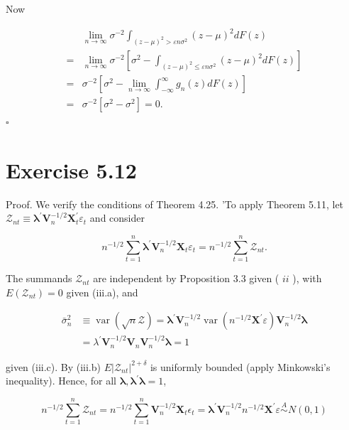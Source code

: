 \documentclass[10pt]{article}
\begin{document}
Now

$$
\begin{aligned}
& \lim _{n \rightarrow \infty} \sigma^{-2} \int_{(z-\mu)^{2}>\varepsilon n \sigma^{2}}(z-\mu)^{2} d F(z) \\
= & \lim _{n \rightarrow \infty} \sigma^{-2}\left[\sigma^{2}-\int_{(z-\mu)^{2} \leq \varepsilon n \sigma^{2}}(z-\mu)^{2} d F(z)\right] \\
= & \sigma^{-2}\left[\sigma^{2}-\lim _{n \rightarrow \infty} \int_{-\infty}^{\infty} g_{n}(z) d F(z)\right] \\
= & \sigma^{-2}\left[\sigma^{2}-\sigma^{2}\right]=0 .
\end{aligned}
$$ \(\square\)

\section*{Exercise 5.12}
Proof. We verify the conditions of Theorem 4.25. 'To apply Theorem 5.11, let $\mathcal{Z}_{n t} \equiv \boldsymbol{\lambda}^{\prime} \mathbf{V}_{n}^{-1 / 2} \mathbf{X}_{t}^{\prime} \varepsilon_{t}$ and consider

$$
n^{-1 / 2} \sum_{t=1}^{n} \boldsymbol{\lambda}^{\prime} \mathbf{V}_{n}^{-1 / 2} \mathbf{X}_{t} \varepsilon_{t}=n^{-1 / 2} \sum_{t=1}^{n} \mathcal{Z}_{n t} .
$$

The summands $\mathcal{Z}_{n t}$ are independent by Proposition 3.3 given ( $i i$ ), with $E\left(\mathcal{Z}_{n t}\right)=0$ given (iii.a), and

$$
\begin{aligned}
\bar{\sigma}_{n}^{2} & \equiv \operatorname{var}(\sqrt{n} \mathcal{Z})=\boldsymbol{\lambda}^{\prime} \mathbf{V}_{n}^{-1 / 2} \operatorname{var}\left(n^{-1 / 2} \mathbf{X}^{\prime} \varepsilon\right) \mathbf{V}_{n}^{-1 / 2} \boldsymbol{\lambda} \\
& =\lambda^{\prime} \mathbf{V}_{n}^{-1 / 2} \mathbf{V}_{n} \mathbf{V}_{n}^{-1 / 2} \boldsymbol{\lambda}=1
\end{aligned}
$$

given (iii.c). By (iii.b) $E\left|\mathcal{Z}_{n t}\right|^{2+\delta}$ is uniformly bounded (apply Minkowski's inequality). Hence, for all $\boldsymbol{\lambda}, \boldsymbol{\lambda}^{\prime} \boldsymbol{\lambda}=1$,

$$
n^{-1 / 2} \sum_{t=1}^{n} \mathcal{Z}_{n t}=n^{-1 / 2} \sum_{t=1}^{n} \mathbf{V}_{n}^{-1 / 2} \mathbf{X}_{t} \epsilon_{t}=\boldsymbol{\lambda}^{\prime} \mathbf{V}_{n}^{-1 / 2} n^{-1 / 2} \mathbf{X}^{\prime} \varepsilon \stackrel{A}{\sim} N(0,1)
$$
\end{document}
